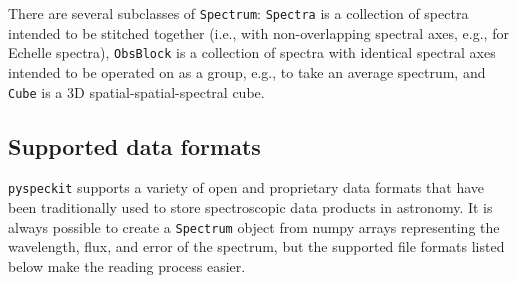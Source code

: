 \documentclass[twocolumn]{aastex63}
\newcommand{\pyspeckit}{\texttt{pyspeckit}\xspace}
\begin{document}
There are several subclasses of \texttt{Spectrum}: \texttt{Spectra}
is a collection of spectra intended to be stitched together (i.e., with
non-overlapping spectral axes, e.g., for Echelle spectra), \texttt{ObsBlock} is a collection of spectra
with identical spectral axes intended to be operated on as a group, e.g., to
take an average spectrum, and \texttt{Cube} is a 3D spatial-spatial-spectral
cube.

\subsection{Supported data formats}

\pyspeckit supports a variety of open and proprietary data formats that have
been traditionally used to store spectroscopic data products in astronomy. 
It is always possible to create a \texttt{Spectrum} object from numpy \citep{vanderWalt2011,Harris2020} arrays
representing the wavelength, flux, and error of the spectrum, but
the supported file formats listed below make the reading process easier.
\end{document}
